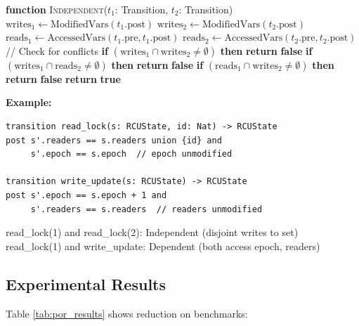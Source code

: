 \documentclass[conference]{IEEEtran}
\begin{document}
\begin{algorithm}
\caption{Static Independence Detection}
\label{alg:independence}
\begin{algorithmic}
\STATE \textbf{function} \textsc{Independent}($t_1$: Transition, $t_2$: Transition)
\STATE \quad $\text{writes}_1 \gets \text{ModifiedVars}(t_1.\text{post})$
\STATE \quad $\text{writes}_2 \gets \text{ModifiedVars}(t_2.\text{post})$
\STATE \quad $\text{reads}_1 \gets \text{AccessedVars}(t_1.\text{pre}, t_1.\text{post})$
\STATE \quad $\text{reads}_2 \gets \text{AccessedVars}(t_2.\text{pre}, t_2.\text{post})$
\STATE
\STATE \quad // Check for conflicts
\STATE \quad \textbf{if} $(\text{writes}_1 \cap \text{writes}_2 \neq \emptyset)$ \textbf{then}
\STATE \quad \quad \textbf{return} \textbf{false} 
\STATE \quad \textbf{if} $(\text{writes}_1 \cap \text{reads}_2 \neq \emptyset)$ \textbf{then}
\STATE \quad \quad \textbf{return} \textbf{false} 
\STATE \quad \textbf{if} $(\text{reads}_1 \cap \text{writes}_2 \neq \emptyset)$ \textbf{then}
\STATE \quad \quad \textbf{return} \textbf{false} 
\STATE
\STATE \quad \textbf{return} \textbf{true}
\end{algorithmic}
\end{algorithm}

\textbf{Example:}
\begin{lstlisting}
transition read_lock(s: RCUState, id: Nat) -> RCUState
post s'.readers == s.readers union {id} and
     s'.epoch == s.epoch  // epoch unmodified

transition write_update(s: RCUState) -> RCUState
post s'.epoch == s.epoch + 1 and
     s'.readers == s.readers  // readers unmodified
\end{lstlisting}

read\_lock(1) and read\_lock(2): Independent (disjoint writes to set)\\
read\_lock(1) and write\_update: Dependent (both access epoch, readers)

\subsection{Experimental Results}

Table \ref{tab:por_results} shows reduction on benchmarks:
\end{document}
